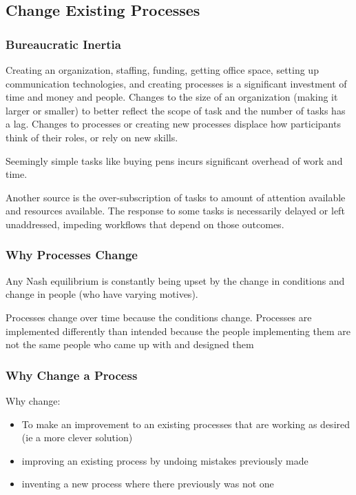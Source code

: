 \subsection{Change Existing Processes\label{sec:change_a_process}}

\subsubsection{Bureaucratic Inertia}

Creating an organization, staffing, funding, getting office space, setting up communication technologies, and creating processes is a significant investment of time and money and people. Changes to the size of an organization (making it larger or smaller) to better reflect the scope of task and the number of tasks has a lag. Changes to processes or creating new processes displace how participants think of their roles, or rely on new skills. 

Seemingly simple tasks like buying pens incurs significant overhead of work and time. 

Another source is the over-subscription of tasks to amount of attention available and resources available. The response to some tasks is necessarily delayed or left unaddressed, impeding workflows that depend on those outcomes. 



\subsubsection{Why Processes Change}

Any Nash equilibrium is constantly being upset by the change in conditions and change in people (who have varying motives).

Processes change over time because the conditions change. Processes are implemented differently than intended because the people implementing them are not the same people who came up with and designed them


\subsubsection{Why Change a Process}
Why change:
\begin{itemize}
    \item To make an improvement to an existing processes that are working as desired (ie a more clever solution)
    \item improving an existing process by undoing mistakes previously made
    \item inventing a new process where there previously was not one
\end{itemize}

